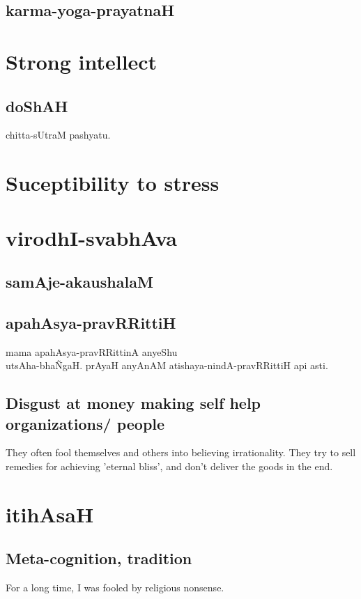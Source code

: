 \documentclass[oneside, article]{memoir}
\begin{document}
\subsection{karma-yoga-prayatnaH}


\section{Strong intellect}

\subsection{doShAH}
chitta-sUtraM pashyatu.

\section{Suceptibility to stress}


\section{virodhI-svabhAva}


\subsection{samAje-akaushalaM}


\subsection{apahAsya-pravRRittiH}
mama apahAsya-pravRRittinA anyeShu \\
utsAha-bha\~NgaH. prAyaH anyAnAM atishaya-nindA-pravRRittiH api asti.

\subsection{Disgust at money making self help organizations/ people}
They often fool themselves and others into believing irrationality. They try to sell remedies for achieving 'eternal bliss', and don't deliver the goods in the end.

\section{itihAsaH}
\subsection{Meta-cognition, tradition}
For a long time, I was fooled by religious nonsense.
\end{document}
